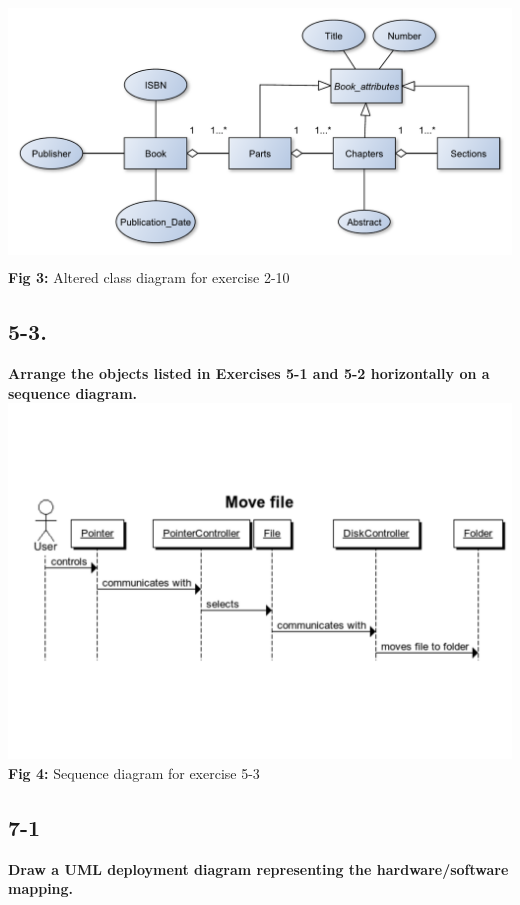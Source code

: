 \documentclass[12pt]{article}
\begin{document}
\includegraphics[height=70mm]{2-10}\\
\textbf{Fig 3:} Altered class diagram for exercise 2-10










\newpage
\subsection{5-3.}
\textbf{Arrange the objects listed in Exercises 5-1 and 5-2 horizontally on a sequence diagram.}\\
\includegraphics[scale=0.5]{5-3}\\
\textbf{Fig 4:} Sequence diagram for exercise 5-3


\newpage
\subsection{7-1}
\textbf{Draw a UML deployment diagram representing the hardware/software mapping.}\\
\end{document}
